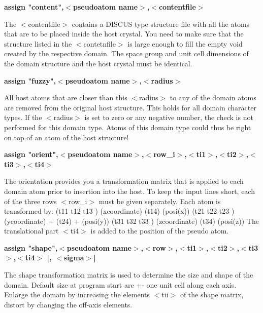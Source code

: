 {\bf assign "content",$ <$pseudoatom name$> $,$ <$contentfile$> $ \par }
\par
\vspace{3pt}
The $ <$contentfile$> $ contains a DISCUS type structure file with all the 
atoms that are to be placed inside the host crystal. You need to make 
sure that the structure listed in the $ <$contetnfile$> $ is large enough 
to fill the empty void created by the respective domain. 
The space group and unit cell dimensions of the domain structure and 
the host crystal must be identical. 
\par
{\bf assign "fuzzy",$ <$pseudoatom name$> $,$ <$radius$> $ \par }
\par
\vspace{3pt}
All host atoms that are closer than this $ <$radius$> $ to any of the 
domain atoms are removed from the original host structure. This holds 
for all domain character types. 
If the $ <$radius$> $ is set to zero or any negative number, the check is 
not performed for this domain type. Atoms of this domain type could 
thus be right on top of an atom of the host structure! 
\par
{\bf assign "orient",$ <$pseudoatom name$> $,$ <$row\_i$> $,$ <$ti1$> $,$ <$ti2$> $,$ <$ti3$> $,$ <$ti4$> $ \par }
\par
\vspace{3pt}
The orientation provides you a transformation matrix that is applied 
to each domain atom prior to insertion into the host. 
To keep the input lines short, each of the three rows $ <$row\_i$> $ must 
be given separately. 
Each atom is transformed by: 
(t11  t12  t13 ) (xcoordinate)   (t14)   (posi(x)) 
(t21  t22  t23 ) (ycoordinate) + (t24) + (posi(y)) 
(t31  t32  t33 ) (zcoordinate)   (t34)   (posi(z)) 
The translational part $ <$ti4$> $ is added to the position of the 
pseudo atom. 
\par
{\bf assign "shape",$ <$pseudoatom name$> $,$ <$row$> $,$ <$ti1$> $,$ <$ti2$> $,$ <$ti3$> $,$ <$ti4$> $ [, $ <$sigma$> $] \par }
\par
\vspace{3pt}
The shape transformation matrix is used to determine the size and shape 
of the domain. Default size at program start are +- one unit cell 
along each axis. Enlarge the domain by increasing the elements $ <$tii$> $ 
of the shape matrix, distort by changing the off-axis elements. 
